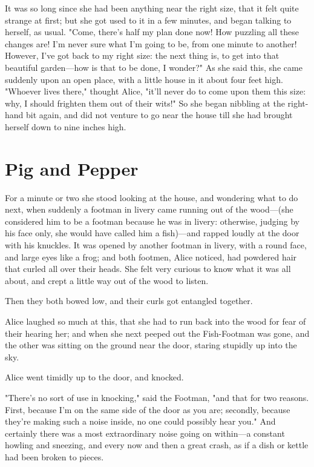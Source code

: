 It was so long since she had been anything near the right size, that it felt quite strange at first; but she got used to it in a few minutes, and began talking to herself, as usual. "Come, there's half my plan done now! How puzzling all these changes are! I'm never sure what I'm going to be, from one minute to another! However, I've got back to my right size: the next thing is, to get into that beautiful garden—how is that to be done, I wonder?" As she said this, she came suddenly ​upon an open place, with a little house in it about four feet high. "Whoever lives there," thought Alice, "it'll never do to come upon them this size: why, I should frighten them out of their wits!" So she began nibbling at the right-hand bit again, and did not venture to go near the house till she had brought herself down to nine inches high.

\quebra\chapter*{Pig and Pepper}

For a minute or two she stood looking at the house, and wondering what to do next, when suddenly a footman in livery came running out of the wood—(she considered him to be a footman because he was in livery: otherwise, judging by his face only, she would have called him a fish)—and rapped loudly at the door with his knuckles. It was opened by another footman in livery, with a round face, and large eyes like a frog; and both footmen, Alice noticed, had powdered hair that curled all over their heads. She felt very curious to know what it was all about, and crept a little way out of the wood to listen.

Then they both bowed low, and their curls got entangled together.

Alice laughed so much at this, that she had to run back into the wood for fear of their hearing her; and when she next peeped out the Fish-Footman was gone, and the other was sitting on the ground near the door, staring stupidly up into the sky.

Alice went timidly up to the door, and knocked.

"There's no sort of use in knocking," said the Footman, "and that for two reasons. First, because I'm on the same side of the door as you are; secondly, because they're making such a noise inside, no one could possibly hear you." And certainly there was a most extraordinary noise going on within—a constant howling and sneezing, and every now and then a great ​crash, as if a dish or kettle had been broken to pieces.

